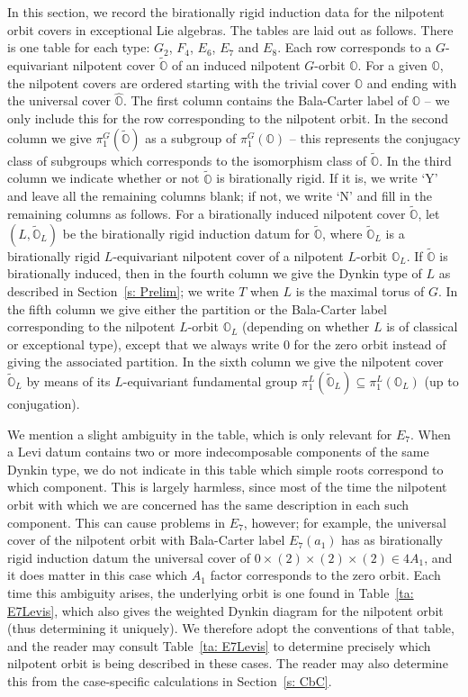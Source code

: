 \documentclass[11pt]{amsart}
\renewcommand{\O}{{\mathbb O}}
\newcommand{\covO}{\widetilde{\O}}
\newcommand{\hatO}{\widehat{\O}}
\numberwithin{equation}{section}
\begin{document}
	In this section, we record the birationally rigid induction data for the nilpotent orbit covers in exceptional Lie algebras. The tables are laid out as follows. There is one table for each type: $G_2$, $F_4$, $E_6$, $E_7$ and $E_8$. Each row corresponds to a $G$-equivariant nilpotent cover $\covO$ of an induced nilpotent $G$-orbit $\O$. For a given $\O$, the nilpotent covers are ordered starting with the trivial cover $\O$ and ending with the universal cover $\hatO$. The first column contains the Bala-Carter label of $\O$ -- we only include this for the row corresponding to the nilpotent orbit. In the second column we give $\pi_1^G(\covO)$ as a subgroup of $\pi_1^G(\O)$ -- this represents the conjugacy class of subgroups which corresponds to the isomorphism class of $\covO$. In the third column we indicate whether or not $\covO$ is birationally rigid. If it is, we write `Y' and leave all the remaining columns blank; if not, we write `N' and fill in the remaining columns as follows. For a birationally induced nilpotent cover $\covO$, let $(L, \covO_L)$ be the birationally rigid induction datum for $\covO$, where $\covO_L$ is a birationally rigid $L$-equivariant nilpotent cover of a nilpotent $L$-orbit $\O_L$. If $\covO$ is birationally induced, then in the fourth column we give the Dynkin type of $L$ as described in Section~\ref{s: Prelim}; we write $T$ when $L$ is the maximal torus of $G$. In the fifth column we give either the partition or the Bala-Carter label corresponding to the nilpotent $L$-orbit $\O_L$ (depending on whether $L$ is of classical or exceptional type), except that we always write $0$ for the zero orbit instead of giving the associated partition. In the sixth column we give the nilpotent cover $\covO_L$ by means of its $L$-equivariant fundamental group $\pi_1^L(\covO_L)\subseteq \pi_1^L(\O_L)$ (up to conjugation).
	
	We mention a slight ambiguity in the table, which is only relevant for $E_7$. When a Levi datum contains two or more indecomposable components of the same Dynkin type, we do not indicate in this table which simple roots correspond to which component. This is largely harmless, since most of the time the nilpotent orbit with which we are concerned has the same description in each such component. This can cause problems in $E_7$, however; for example, the universal cover of the nilpotent orbit with Bala-Carter label $E_7(a_1)$ has as birationally rigid induction datum the universal cover of $0\times(2)\times(2)\times(2)\in 4A_1$, and it does matter in this case which $A_1$ factor corresponds to the zero orbit. Each time this ambiguity arises, the underlying orbit is one found in Table~\ref{ta: E7Levis}, which also gives the weighted Dynkin diagram for the nilpotent orbit (thus determining it uniquely). We therefore adopt the conventions of that table, and the reader may consult Table~\ref{ta: E7Levis} to determine precisely which nilpotent orbit is being described in these cases. The reader may also determine this from the case-specific calculations in Section~\ref{s: CbC}. 
	
\end{document}
